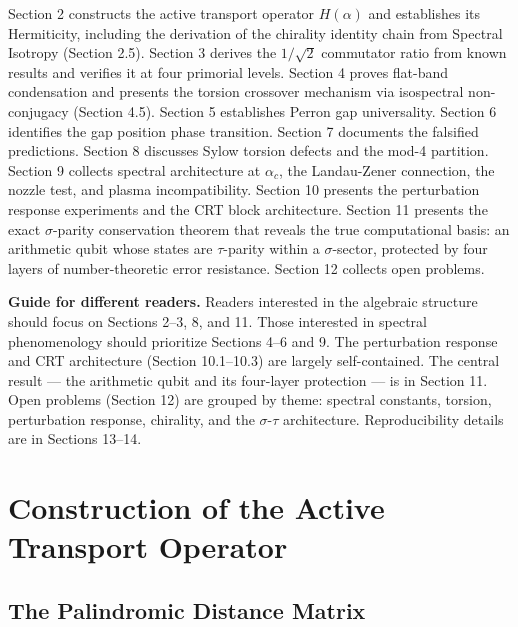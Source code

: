\documentclass[11pt,letterpaper]{article}
\theoremstyle{definition}
\theoremstyle{remark}
\begin{document}
Section 2 constructs the active transport operator $H(\alpha)$ and establishes its Hermiticity, including the derivation of the chirality identity chain from Spectral Isotropy (Section 2.5). Section 3 derives the $1/\sqrt{2}$ commutator ratio from known results and verifies it at four primorial levels. Section 4 proves flat-band condensation and presents the torsion crossover mechanism via isospectral non-conjugacy (Section 4.5). Section 5 establishes Perron gap universality. Section 6 identifies the gap position phase transition. Section 7 documents the falsified predictions. Section 8 discusses Sylow torsion defects and the mod-4 partition. Section 9 collects spectral architecture at $\alpha_c$, the Landau-Zener connection, the nozzle test, and plasma incompatibility. Section 10 presents the perturbation response experiments and the CRT block architecture. Section 11 presents the exact $\sigma$-parity conservation theorem that reveals the true computational basis: an arithmetic qubit whose states are $\tau$-parity within a $\sigma$-sector, protected by four layers of number-theoretic error resistance. Section 12 collects open problems.

\textbf{Guide for different readers.} Readers interested in the algebraic structure should focus on Sections 2--3, 8, and 11. Those interested in spectral phenomenology should prioritize Sections 4--6 and 9. The perturbation response and CRT architecture (Section 10.1--10.3) are largely self-contained. The central result --- the arithmetic qubit and its four-layer protection --- is in Section 11. Open problems (Section 12) are grouped by theme: spectral constants, torsion, perturbation response, chirality, and the $\sigma$-$\tau$ architecture. Reproducibility details are in Sections 13--14.


\section{Construction of the Active Transport Operator}\label{construction-of-the-active-transport-operator}

\subsection{The Palindromic Distance Matrix}\label{the-palindromic-distance-matrix}
\end{document}
